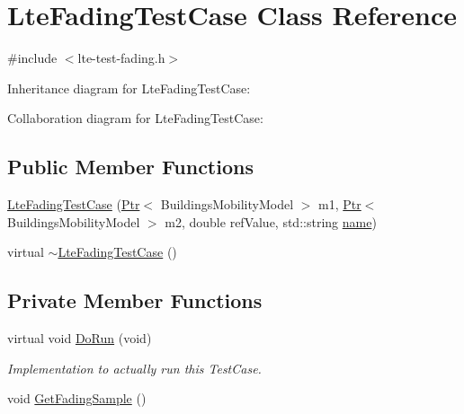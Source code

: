 \hypertarget{classLteFadingTestCase}{}\section{Lte\+Fading\+Test\+Case Class Reference}
\label{classLteFadingTestCase}


{\ttfamily \#include $<$lte-\/test-\/fading.\+h$>$}



Inheritance diagram for Lte\+Fading\+Test\+Case\+:


Collaboration diagram for Lte\+Fading\+Test\+Case\+:
\subsection*{Public Member Functions}
\begin{DoxyCompactItemize}
\item 
\hyperlink{classLteFadingTestCase_a7bc342d5d41581aa8c8303c25a3e325f}{Lte\+Fading\+Test\+Case} (\hyperlink{classns3_1_1Ptr}{Ptr}$<$ Buildings\+Mobility\+Model $>$ m1, \hyperlink{classns3_1_1Ptr}{Ptr}$<$ Buildings\+Mobility\+Model $>$ m2, double ref\+Value, std\+::string \hyperlink{generate__test__data__lte__spectrum__model_8m_ab74e6bf80237ddc4109968cedc58c151}{name})
\item 
virtual \hyperlink{classLteFadingTestCase_a18e6ab2c038f49bd81a2606e74e4ba9b}{$\sim$\+Lte\+Fading\+Test\+Case} ()
\end{DoxyCompactItemize}
\subsection*{Private Member Functions}
\begin{DoxyCompactItemize}
\item 
virtual void \hyperlink{classLteFadingTestCase_af4d79285b8c87cc46d637330961f2655}{Do\+Run} (void)
\begin{DoxyCompactList}\small\item\em Implementation to actually run this Test\+Case. \end{DoxyCompactList}\item 
void \hyperlink{classLteFadingTestCase_a76b41a3b76ff79eca2f2ea5f4973e3be}{Get\+Fading\+Sample} ()
\end{DoxyCompactItemize}
